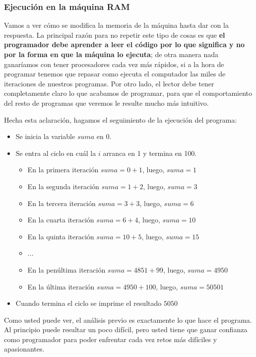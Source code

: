 

\subsubsection{Ejecución en la máquina RAM}

Vamos a ver cómo se modifica la memoria de la máquina hasta dar con la respuesta. La principal razón para no repetir este tipo de cosas es que \textbf{el programador debe aprender a leer el código por lo que significa y no por la forma en que la máquina lo ejecuta}; de otra manera nada ganaríamos con tener procesadores cada vez más rápidos, si a la hora de programar tenemos que repasar como ejecuta el computador las miles de iteraciones de nuestros programas. Por otro lado, el lector debe tener completamente claro lo que acabamos de programar, para que el comportamiento del resto de programas que veremos le resulte mucho más intuitivo.

Hecha esta aclaración, hagamos el seguimiento de la ejecución del programa:

\begin{itemize}
\item Se inicia la variable $suma$ en 0.
\item Se entra al ciclo en cuál la $i$ arranca en 1 y termina en 100.
	\begin{itemize}
	\item En la primera iteración $suma=0+1$, luego, $suma = 1$
	\item En la segunda iteración $suma=1+2$, luego, $suma = 3$
	\item En la tercera iteración $suma=3+3$, luego, $suma = 6$
	\item En la cuarta iteración $suma=6+4$, luego, $suma = 10$
	\item En la quinta iteración $suma=10+5$, luego, $suma = 15$
	\item ...
	\item En la penúltima iteración $suma=4851+99$, luego, $suma = 4950$
	\item En la última iteración $suma=4950+100$, luego, $suma = 50501$
	\end{itemize}
\item Cuando termina el ciclo se imprime el resultado $5050$
\end{itemize}

Como usted puede ver, el análisis previo es exactamente lo que hace el programa. Al principio puede resultar un poco difícil, pero usted tiene que ganar confianza como programador para poder enfrentar cada vez retos más difíciles y apasionantes.

